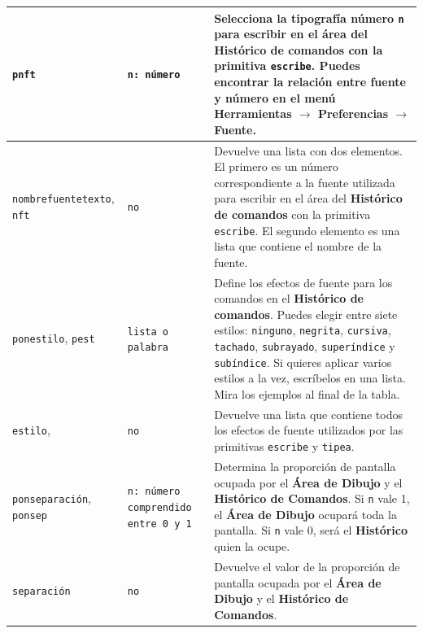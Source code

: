 \begin{center}
\begin{longtable}{|m{35mm}|m{25mm}|m{9cm}|}
      \index{ponnombrefuentetexto@\texttt{ponnombrefuentetexto}}
     \texttt{pnft} \index{pnft@\texttt{pnft}} & \texttt{n: n\'umero} &
        Selecciona la tipograf\'ia n\'umero \texttt{n} para escribir en
        el \'area del \textbf{Hist\'orico de comandos} con la primitiva
        \texttt{escribe}. Puedes encontrar la relaci\'on entre fuente y
        n\'umero en el men\'u \textbf{Herramientas $\rightarrow$ Preferencias
        $\rightarrow$ Fuente.} \\ \hline 
   \texttt{nombrefuentetexto},
       \index{nombrefuentetexto@\texttt{nombrefuentetexto}}
     \texttt{nft} \index{nft@\texttt{nft}} & \texttt{no} &
        Devuelve una lista con dos elementos. El primero es un n\'umero
        correspondiente a la fuente utilizada para escribir en el \'area
        del \textbf{Hist\'orico de comandos} con la primitiva \texttt{escribe}.
        El segundo elemento es una lista que contiene el nombre de la fuente.
                        \\ \hline
   \texttt{ponestilo}, \index{ponestilo@\texttt{ponestilo}}
     \texttt{pest} \index{pest@\texttt{pest}} & \texttt{lista o palabra} &
        Define los efectos de fuente para los comandos en el
        \textbf{Hist\'orico de comandos}. Puedes elegir entre siete
        estilos: \texttt{ninguno}, \index{ninguno@\texttt{ninguno}}
        \texttt{negrita}, \index{negrita@\texttt{negrita}}
        \texttt{cursiva}\index{cursiva@\texttt{cursiva}},
        \texttt{tachado}, \index{tachado@\texttt{tachado}}
        \texttt{subrayado}, \index{subrayado@\texttt{subrayado}}
        \texttt{super\'indice} \index{super\'indice@\texttt{super\'indice}} y
        \texttt{sub\'indice}. \index{sub\'indice@\texttt{sub\'indice}}
        Si quieres aplicar varios estilos a la vez, escr\'ibelos en una
        lista. Mira los ejemplos al final de la tabla.
                        \\ \hline
   \texttt{estilo}, \index{estilo@\texttt{estilo}}
      & \texttt{no} &
        Devuelve una lista que contiene todos los efectos de fuente
        utilizados por las primitivas \texttt{escribe} y \texttt{tipea}.
                        \\ \hline
   \texttt{ponseparaci\'on}, \index{ponseparaci\'on@\texttt{ponseparaci\'on}}
     \texttt{ponsep}%
     \index{ponsep@\texttt{ponsep}} & 
       \texttt{n: n\'umero comprendido entre 0 y 1} &
        Determina la proporci\'on de pantalla ocupada por el
        \textbf{\'Area de Dibujo} y el \textbf{Hist\'orico de Comandos}.
        Si \texttt{n} vale 1, el \textbf{\'Area de Dibujo} ocupar\'a toda
        la pantalla. Si \texttt{n} vale 0, ser\'a el \textbf{Hist\'orico}
        quien la ocupe.\\ \hline 
   \texttt{separaci\'on} \index{separaci\'on@\texttt{separaci\'on}} &
      \texttt{no} &
        Devuelve el valor de la proporci\'on de pantalla ocupada por el
        \textbf{\'Area de Dibujo} y el \textbf{Hist\'orico de Comandos}.
                        \\ \hline
\end{longtable} \end{center}
